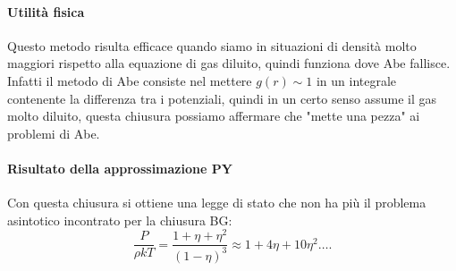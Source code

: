 \paragraph{Utilità fisica}
Questo metodo risulta efficace quando siamo in situazioni di densità molto maggiori rispetto alla equazione di gas diluito, quindi funziona dove Abe fallisce. Infatti il metodo di Abe consiste nel mettere $g(r)\sim 1$ in un integrale contenente la differenza tra i potenziali, quindi in un certo senso assume il gas molto diluito, questa chiusura possiamo affermare che "mette una pezza" ai problemi di Abe.
\paragraph{Risultato della approssimazione PY}
Con questa chiusura si ottiene una legge di stato che non ha più il problema asintotico incontrato per la chiusura BG:
\[
	\frac{P}{\rho kT}=\frac{1+\eta+\eta^2}{\left( 1-\eta \right)^3}
	\approx 
	1 + 4\eta+10\eta^2\ldots
.\] 
